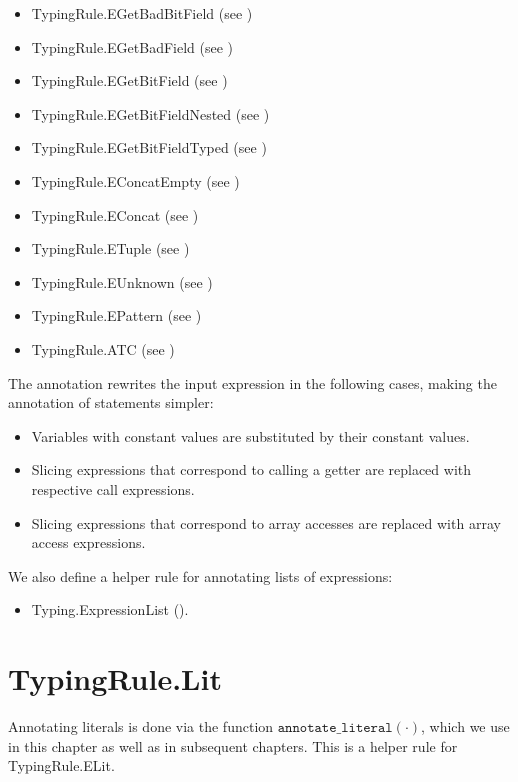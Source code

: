 \documentclass{book}
\newcommand\annotateliteral[1]{\texttt{annotate\_literal}(#1)}
\begin{document}
\begin{itemize}
\item TypingRule.EGetBadBitField (see )
\item TypingRule.EGetBadField (see )
\item TypingRule.EGetBitField (see )
\item TypingRule.EGetBitFieldNested (see )
\item TypingRule.EGetBitFieldTyped (see )
\item TypingRule.EConcatEmpty (see )
\item TypingRule.EConcat (see )
\item TypingRule.ETuple (see )
\item TypingRule.EUnknown (see )
\item TypingRule.EPattern (see )
\item TypingRule.ATC (see )
\end{itemize}

The annotation rewrites the input expression in the following cases, making the annotation of statements simpler:
\begin{itemize}
  \item Variables with constant values are substituted by their constant values.
  \item Slicing expressions that correspond to calling a getter are replaced with respective call expressions.
  \item Slicing expressions that correspond to array accesses are replaced with array access expressions.
\end{itemize}

We also define a helper rule for annotating lists of expressions:
\begin{itemize}
  \item Typing.ExpressionList ().
\end{itemize}

\section{TypingRule.Lit \label{sec:TypingRule.Lit}}

Annotating literals is done via the function $\annotateliteral{\cdot}$,
which we use in this chapter as well as in subsequent chapters.
This is a helper rule for TypingRule.ELit.
\end{document}
